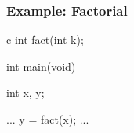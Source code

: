 \documentclass[dvipsnames]{beamer}
\begin{document}
\begin{frame}[fragile]
  \frametitle{Example: Factorial}

  \begin{pygments}{c}
int fact(int k);

int main(void)
{
    int x, y;

    ...
    y = fact(x);
    ...
}
  \end{pygments}
\end{frame}
%
%
%
%
%
%
%
%
%
%
%
\end{document}
